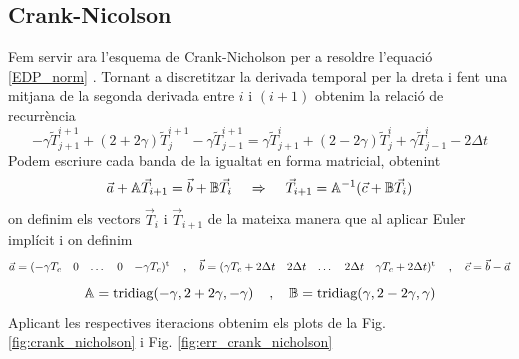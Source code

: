 \documentclass{article}
\begin{document}
\subsection{Crank-Nicolson}
Fem servir ara l'esquema de Crank-Nicholson per a resoldre l'equació \eqref{EDP_norm} \cite{Navau2024}. Tornant a discretitzar la derivada temporal per la dreta i fent una mitjana de la segonda derivada entre $i$ i $(i+1)$ obtenim la relació de recurrència
\begin{equation*}
    -\gamma\tilde{T}_{j+1}^{i+1} + (2+2\gamma)\tilde{T}_{j}^{i+1} - \gamma \tilde{T}_{j-1}^{i+1} = \gamma \tilde{T}_{j+1}^{i} + (2-2\gamma)\tilde{T}_{j}^{i} + \gamma \tilde{T}_{j-1}^{i} - 2\Delta t
\end{equation*}
Podem escriure cada banda de la igualtat en forma matricial, obtenint
\begin{equation*}
    \vec{a} + \mathbb{A} \vec{T}_{i+1} = \vec{b} + \mathbb{B}\vec{T}_{i} \hspace{4 mm} \Rightarrow \hspace{4 mm} \vec{T}_{i+1} = \mathbb{A}^{-1}(\vec{c}+\mathbb{B}\vec{T}_{i})
\end{equation*}
on definim els vectors $\vec{T}_{i}$ i $\vec{T}_{i+1}$ de la mateixa manera que al aplicar Euler implícit i on definim
\begin{equation*}
    \vec{a} = \begin{matrix} (-\gamma T_c & 0 & \dots & 0 & -\gamma T_c)^{\text{t}}\end{matrix} \hspace{4 mm} \text{,} \hspace{4 mm} \vec{b} = \begin{matrix} (\gamma T_c + 2\Delta t & 2\Delta t & \dots & 2\Delta t & \gamma T_c + 2\Delta t)^{\text{t}} \end{matrix} \hspace{4 mm} \text{,} \hspace{4 mm} \vec{c} = \vec{b} - \vec{a}
\end{equation*}
\begin{equation*}
    \mathbb{A} = \text{tridiag}(-\gamma,2+2\gamma,-\gamma) \hspace{4 mm} \text{,} \hspace{4 mm} \mathbb{B} = \text{tridiag}(\gamma,2-2\gamma,\gamma)
\end{equation*}
Aplicant les respectives iteracions obtenim els plots de la Fig. \ref{fig:crank_nicholson} i Fig. \ref{fig:err_crank_nicholson}
\end{document}
